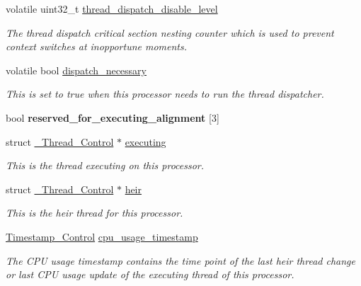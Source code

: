 \begin{DoxyCompactItemize}
volatile uint32\+\_\+t \mbox{\hyperlink{structPer__CPU__Control_a76fecf04eaa2fa1a3acade2171fe2e75}{thread\+\_\+dispatch\+\_\+disable\+\_\+level}}
\begin{DoxyCompactList}\small\item\em The thread dispatch critical section nesting counter which is used to prevent context switches at inopportune moments. \end{DoxyCompactList}\item 
volatile bool \mbox{\hyperlink{structPer__CPU__Control_a96af7f4805c6b75b775f5304e6c39d99}{dispatch\+\_\+necessary}}
\begin{DoxyCompactList}\small\item\em This is set to true when this processor needs to run the thread dispatcher. \end{DoxyCompactList}\item 
\mbox{\label{structPer__CPU__Control_aefd7a737e9da4942192ae4c5db1179dd}} 
bool {\bfseries reserved\+\_\+for\+\_\+executing\+\_\+alignment} \mbox{[}3\mbox{]}
\item 
struct \mbox{\hyperlink{struct__Thread__Control}{\+\_\+\+Thread\+\_\+\+Control}} $\ast$ \mbox{\hyperlink{structPer__CPU__Control_ab798eb05fe75cb2f73cae76b1b209bab}{executing}}
\begin{DoxyCompactList}\small\item\em This is the thread executing on this processor. \end{DoxyCompactList}\item 
struct \mbox{\hyperlink{struct__Thread__Control}{\+\_\+\+Thread\+\_\+\+Control}} $\ast$ \mbox{\hyperlink{structPer__CPU__Control_a04b6cae98eb4a23510c81d90caf0a196}{heir}}
\begin{DoxyCompactList}\small\item\em This is the heir thread for this processor. \end{DoxyCompactList}\item 
\mbox{\hyperlink{group__SuperCoreTimeStamp_ga8508036506d5211c98844c88045e2410}{Timestamp\+\_\+\+Control}} \mbox{\hyperlink{structPer__CPU__Control_a9fbfc99808e4e02178776e66334a4eb4}{cpu\+\_\+usage\+\_\+timestamp}}
\begin{DoxyCompactList}\small\item\em The C\+PU usage timestamp contains the time point of the last heir thread change or last C\+PU usage update of the executing thread of this processor. \end{DoxyCompactList}\item 

\end{DoxyCompactItemize}
